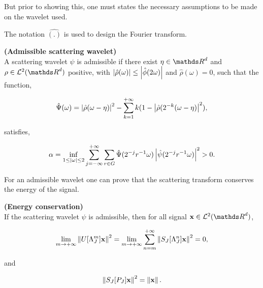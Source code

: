 \documentclass[a4paper,11pt]{report}
\begin{document}
			But prior to showing this, one must states the necessary assumptions to be made on the wavelet used.
						
			\begin{note}
			  The notation $\hat{(.)}$ is used to design the Fourier transform.
			\end{note}

						
			\begin{defn} \textbf{(Admissible scattering wavelet)}\\ 
				A scattering wavelet $\psi$ is admissible if there exist $\eta \in \dsR^{d}$ and $\rho \in \mcalL^{2}(\dsR^{d})$ positive, with $\left| \hat{\rho}(\omega) \right| \leq \left| \hat{\phi}(2\omega) \right|$ and $\hat{\rho}(\omega)=0$, such that the function,
				
				\begin{equation}
					\hat{\Psi}(\omega) = \left| \hat{\rho}(\omega - \eta) \right|^{2} - \sum_{k=1}^{+\infty}k(1-\left| \hat{\rho}(2^{-k}(\omega - \eta) \right|^{2}),
				\end{equation}
				
				satisfies,
				
				\begin{equation}
				  \alpha = \inf_{1 \leq \left| \omega \right|\leq 2} \sum_{j=-\infty}^{+\infty}\sum_{r \in G} \hat{\Psi}(2^{-j}r^{-1}\omega) \left| \hat{\psi}(2^{-j}r^{-1}\omega) \right|^{2} > 0.\\
				\end{equation}
				
				\label{def:Admissible wavelet}
			\end{defn}

			For an admissible wavelet one can prove that the scattering transform conserves the energy of the signal.
			
			\begin{thm} \textbf{(Energy conservation)}\\ 
				If the scattering wavelet $\psi$ is admissible, then for all signal $\bfx \in \mcalL^{2}(\dsR^{d})$,
				
				\begin{equation}
				  \lim_{m \rightarrow +\infty} \left\lVert U[\Lambda_{J}^{m}]{\bf x} \right\rVert^{2} = \lim_{m \rightarrow +\infty} \sum_{n=m}^{+\infty} \left\lVert S_{J}[\Lambda_{J}^{n}]{\bf x} \right\rVert^{2} = 0,
					\label{eq:energy conservation 1}
				\end{equation}
				
				and
				
				\begin{equation}
				  \left\lVert S_{J}[P_{J}]{\bf x} \right\rVert^{2} = \left\lVert {\bf x} \right\rVert.
				  \label{eq:energy conservation 2}
				\end{equation}
				\label{thm:Energy conservation}
			\end{thm}
\end{document}
